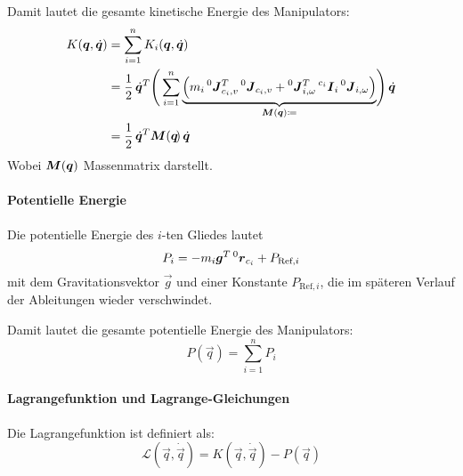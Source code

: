 			Damit lautet die gesamte kinetische Energie des Manipulators:
			\begin{align*}
				K(\bm{q}, \dot{\bm{q}}) & = \sum_{i = 1}^{n} K_i(\bm{q}, \dot{\bm{q}})                                                                                                                                                                                                                                                                                          \\
				                          & = \frac{1}{2} \, \dot{\bm{q}}^T \Bigg( \sum_{i = 1}^{n} \underbrace{\Big( m_i \prescript{0}{}{\bm{J}}_{c_i, v}^T \prescript{0}{}{\bm{J}}_{c_i, v} + \prescript{0}{}{\bm{J}}_{i, \omega}^T \prescript{c_i}{}{\bm{I}}_i \prescript{0}{}{\bm{J}}_{i, \omega} \Big)}_{\bm{M}(\bm{q}) \coloneqq} \! \Bigg)\, \dot{\bm{q}} \\
				                          & = \frac{1}{2} \, \dot{\bm{q}}^T \bm{M}(\bm{q}\!)\, \dot{\bm{q}}
			\end{align*}
			Wobei \( \bm{M}(\bm{q}) \) Massenmatrix darstellt.

		\paragraph{Potentielle Energie}
			Die potentielle Energie des \(i\)-ten Gliedes lautet
			\begin{equation*}
				P_i = -m_i \bm{g}^T \prescript{0}{}{\bm{r}}_{c_i} + P_{\text{Ref}, i}
			\end{equation*}
			mit dem Gravitationsvektor \( \vec{g} \) und einer Konstante \( P_{\text{Ref}, i} \), die im späteren Verlauf der Ableitungen wieder verschwindet.

			Damit lautet die gesamte potentielle Energie des Manipulators:
			\begin{equation*}
				P(\vec{q}\!) = \sum_{i = 1}^{n} P_i
			\end{equation*}

		\paragraph{Lagrangefunktion und Lagrange-Gleichungen}
			Die Lagrangefunktion ist definiert als:
			\begin{equation*}
				\mathcal{L}(\vec{q}, \dot{\vec{q}}\!) = K(\vec{q}, \dot{\vec{q}}\!) - P(\vec{q}\!)
			\end{equation*}

